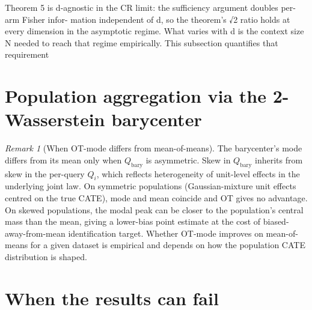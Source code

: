 \documentclass[11pt]{article}
\theoremstyle{remark}
\newtheorem{remark}[theorem]{Remark}
\begin{document}
Theorem 5 is d-agnostic in the CR limit: the sufficiency argument doubles per-arm Fisher infor-
mation independent of d, so the theorem’s √2 ratio holds at every dimension in the asymptotic
regime. What varies with d is the context size N needed to reach that regime empirically. This
subsection quantifies that requirement


\section{Population aggregation via the 2-Wasserstein barycenter}
\label{sec:ot-aggregation}

\begin{remark}[When OT-mode differs from mean-of-means]
The barycenter's mode differs from its mean only when
$Q_{\mathrm{bary}}$ is asymmetric. Skew in $Q_{\mathrm{bary}}$
inherits from skew in the per-query $Q_i$, which reflects
heterogeneity of unit-level effects in the underlying joint law. On
symmetric populations (Gaussian-mixture unit effects centred on the
true CATE), mode and mean coincide and OT gives no advantage. On
skewed populations, the modal peak can be closer to the population's
central mass than the mean, giving a lower-bias point estimate at the
cost of biased-away-from-mean identification target. Whether OT-mode
improves on mean-of-means for a given dataset is empirical and depends
on how the population CATE distribution is shaped.
\end{remark}

\section{When the results can fail}
\label{sec:failure-modes}
\end{document}
